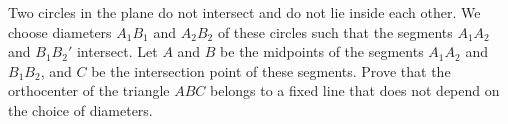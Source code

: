 Two circles in the plane do not intersect and do not lie inside each other. We choose diameters $A_1B_1$ and $A_2B_2$ of these circles such that the segments $A_1A_2$ and $B_1B_2'$ intersect. Let $A$ and $B$ be the midpoints of the segments $A_1A_2$ and $B_1B_2$,  and $C$ be the intersection point of these segments. Prove that the orthocenter of the triangle $ABC$ belongs to a fixed line that does not depend on the choice of diameters.